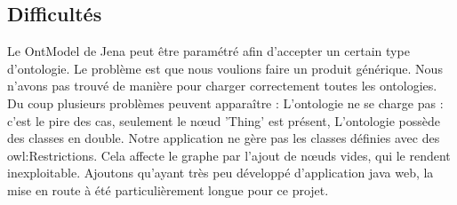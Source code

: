 \subsection{Difficultés}

    Le OntModel de Jena peut être paramétré afin d’accepter un certain type d'ontologie. Le problème est que nous voulions faire un produit générique. Nous n'avons pas trouvé de manière pour charger correctement toutes les ontologies. Du coup plusieurs problèmes peuvent apparaître :
        L'ontologie ne se charge pas : c'est le pire des cas, seulement le nœud 'Thing' est présent,
        L'ontologie possède des classes en double.
    Notre application ne gère pas les classes définies avec des owl:Restrictions. Cela affecte le graphe par l'ajout de nœuds vides, qui le rendent inexploitable.
    Ajoutons qu'ayant très peu développé d'application java web, la mise en route à été particulièrement longue pour ce projet.

